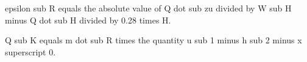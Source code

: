epsilon sub R equals the absolute value of Q dot sub zu divided by W sub H minus Q dot sub H divided by 0.28 times H.  

Q sub K equals m dot sub R times the quantity u sub 1 minus h sub 2 minus x superscript 0.